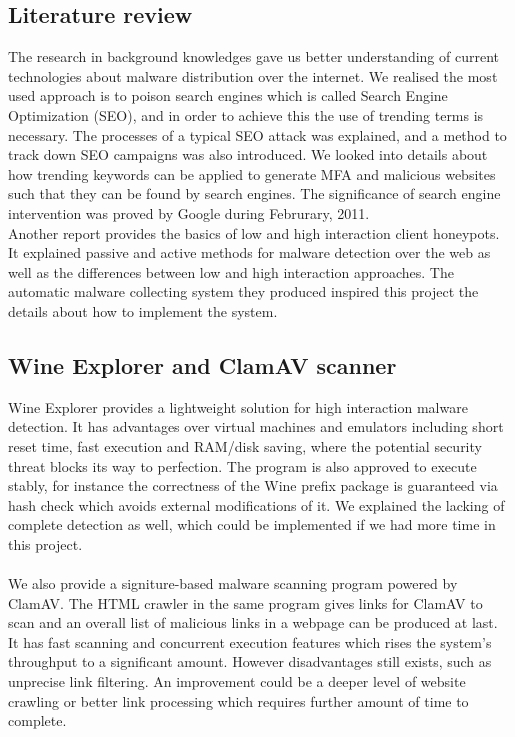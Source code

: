 \subsection{Literature review}
The research in background knowledges gave us better understanding of current 
technologies about malware distribution over the internet. We realised the 
most used approach is to poison search engines which is called Search Engine 
Optimization (SEO), and in order to achieve this the use of trending terms 
is necessary. The processes of a typical SEO attack was explained, and a 
method to 
track down SEO campaigns was also introduced. We looked into details about 
how trending keywords can be applied to generate MFA and malicious websites 
such that they can be found by search engines. The significance of search 
engine intervention was proved by Google during Februrary, 2011. \\
Another report provides the basics of low and high interaction client 
honeypots. It explained passive and active methods for malware detection 
over the web as well as the differences between low and high interaction 
approaches. The automatic malware collecting system they produced inspired 
this project the details about how to implement the system. 

\subsection{Wine Explorer and ClamAV scanner}
Wine Explorer provides a lightweight solution for high interaction malware 
detection. It has advantages over virtual machines and emulators including 
short reset time, fast execution and RAM/disk saving, where the potential 
security threat blocks its way to perfection. The program is also approved to 
execute stably, for instance the correctness of the Wine prefix package is 
guaranteed via hash check which avoids external modifications of it. We 
explained the lacking of complete detection as well, which could be 
implemented if we had more time in this project. 
\paragraph{}
We also provide a signiture-based malware scanning program powered by ClamAV. 
The 
HTML crawler in the same program gives links for ClamAV to scan and an 
overall list of malicious links in a webpage can be produced at last. 
It has fast scanning and concurrent execution features which rises 
the system's throughput to a significant amount. However disadvantages still 
exists, 
such as unprecise link filtering. An improvement could be a deeper level of 
website crawling or better link processing which requires further amount 
of time to complete. 
